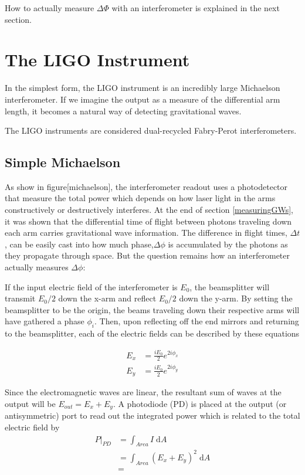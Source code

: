 \documentclass[oneside]{book}
\begin{document}
	How to actually measure $\Delta \Phi$ with an interferometer is explained in the next section.
	\section{The LIGO Instrument}
	In the simplest form, the LIGO instrument is an incredibly large Michaelson interferometer.  If we imagine the output as a measure of the differential arm length, it becomes a natural way of detecting gravitational waves.
	
	The LIGO instruments are considered dual-recycled Fabry-Perot interferometers.
	
		\subsection{Simple Michaelson}
		As show in figure[michaelson], the interferometer readout uses a photodetector that measure the total power which depends on how laser light in the arms constructively or destructively interferes.  
		At the end of section \ref{measuringGWs}, it was shown that the differential time of flight between photons traveling down each arm carries gravitational wave information.  The difference in flight times, $\Delta t$, can be easily cast into how much phase,$\Delta \phi$ is accumulated by the photons as they propagate through space.  But the question remains how an interferometer actually measures $\Delta \phi$:
		
		If the input electric field of the interferometer is $E_0$, the beamsplitter will transmit $E_0 /2$ down the x-arm and reflect $E_0 /2$ down the y-arm.  By setting the beamsplitter to be the origin,  the beams traveling down their respective arms will have gathered a phase $\phi_i$. Then, upon reflecting off the end mirrors and returning to the beamsplitter, each of the electric fields can be described by these equations
		
			\begin{equation}
			\begin{aligned}
				E_{x} 	&=	\frac{i E_0}{2} e^{2i\phi_{x}}	
			\\	E_{y} 	&=	\frac{i E_0}{2} e^{2i\phi_{y}}
			\end{aligned}
			\end{equation}
			
		Since the electromagnetic waves are linear, the resultant sum of waves at the output will be $E_{out} = E_x + E_y$. A photodiode (PD) is placed at the output (or antisymmetric) port to read out the integrated power which is related to the total electric field by
		\begin{equation}
		\begin{aligned}
			P \vert_{PD}	&= \int_{Area} I \;				\text{d}A 
		\\					&= \int_{Area} (E_x + E_y)^2 \;	\text{d}A 
		\\					&= 
		\end{aligned}
		\end{equation}
		
\end{document}
